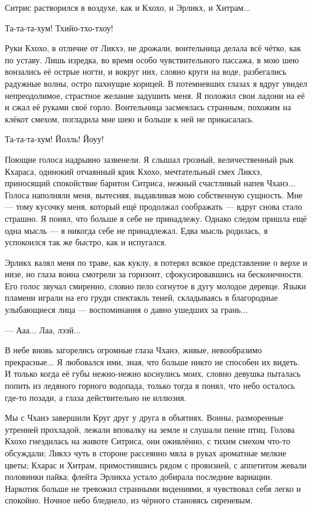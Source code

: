 Ситрис растворился в воздухе, как и Кхохо, и Эрликх, и Хитрам...

Та-та-та-хум!
Тхийо-тхо-тхоу!

Руки Кхохо, в отличие от Ликхэ, не дрожали, воительница делала всё чётко, как по уставу.
Лишь изредка, во время особо чувствительного пассажа, в мою шею вонзались её острые ногти, и вокруг них, словно круги на воде, разбегались радужные волны, остро пахнущие корицей.
В потемневших глазах я вдруг увидел непреодолимое, страстное желание задушить меня.
Я положил свои ладони на её и сжал её руками своё горло.
Воительница засмеялась странным, похожим на клёкот смехом, погладила мне шею и больше к ней не прикасалась.

Та-та-та-хум!
Йолль!
Йоуу!

Поющие голоса надрывно зазвенели.
Я слышал грозный, величественный рык Кхараса, одинокий отчаянный крик Кхохо, мечтательный смех Ликхэ, приносящий спокойствие баритон Ситриса, нежный счастливый напев Чханэ...
Голоса наполняли меня, вытесняя, выдавливая мою собственную сущность.
Мне --- тому кусочку меня, который ещё продолжал соображать --- вдруг снова стало страшно.
Я понял, что больше я себе не принадлежу.
Однако следом пришла ещё одна мысль --- я никогда себе не принадлежал.
Едва мысль родилась, я успокоился так же быстро, как и испугался.

Эрликх валял меня по траве, как куклу, я потерял всякое представление о верхе и низе, но глаза воина смотрели за горизонт, сфокусировавшись на бесконечности.
Его голос звучал смиренно, словно пело согнутое в дугу молодое деревце.
Языки пламени играли на его груди спектакль теней, складываясь в благородные улыбающиеся лица --- воспоминания о давно ушедших за грань...

--- Ааа...
Лаа, лээй...

В небе вновь загорелись огромные глаза Чханэ, живые, невообразимо прекрасные...
Я любовался ими, зная, что больше никто не способен их видеть.
И только когда её губы нежно-нежно коснулись моих, словно девушка пыталась попить из ледяного горного водопада, только тогда я понял, что небо осталось где-то позади, а глаза действительно не иллюзия.

Мы с Чханэ завершили Круг друг у друга в объятиях.
Воины, разморенные утренней прохладой, лежали вповалку на земле и слушали пение птиц.
Голова Кхохо гнездилась на животе Ситриса, они оживлённо, с тихим смехом что-то обсуждали;
Ликхэ чуть в стороне рассеянно мяла в руках ароматные мелкие цветы;
Кхарас и Хитрам, примостившись рядом с провизией, с аппетитом жевали половинки пайка;
флейта Эрликха устало добирала последние вариации.
Наркотик больше не тревожил странными видениями, я чувствовал себя легко и спокойно.
Ночное небо бледнело, из чёрного становясь сиреневым.

